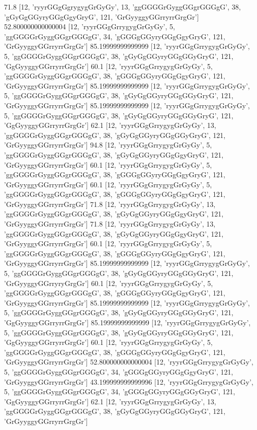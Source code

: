 71.8 [12, 'ryyrGGgGgrygygGrGyGy', 13, 'ggGGGGrGyggGGgrGGGgG', 38, 'gGyGgGGyryGGgGgyGryG', 121, 'GrGyyggyGGrryrrGrgGr']
52.800000000000004 [12, 'ryyrGGgGrrygygGrGyGy', 5, 'ggGGGGrGyggGGgrGGGgG', 34, 'gGGGgGGyryGGgGgyGryG', 121, 'GrGyyggyGGrryrrGrgGr']
85.19999999999999 [12, 'ryyrGGgGrrygygGrGyGy', 5, 'ggGGGGrGyggGGgrGGGgG', 38, 'gGyGgGGyryGGgGGyGryG', 121, 'GgGyyggyGGrryrrGrgGr']
60.1 [12, 'ryyrGGgGrrygygGrGyGy', 5, 'ggGGGGrGyggGGgrGGGgG', 38, 'gGGGgGGyryGGgGgyGryG', 121, 'GrGyyggyGGrryrrGrgGr']
85.19999999999999 [12, 'ryyrGGgGrrygygGrGyGy', 5, 'ggGGGGrGyggGGgrGGGgG', 38, 'gGyGgGGyryGGgGGyGryG', 121, 'GrGyyggyGGrryrrGrgGr']
85.19999999999999 [12, 'ryyrGGgGrrygygGrGyGy', 5, 'ggGGGGrGyggGGgrGGGgG', 38, 'gGyGgGGyryGGgGGyGryG', 121, 'GgGyyggyGGrryrrGrgGr']
62.1 [12, 'ryyrGGgGrrygygGrGyGy', 13, 'ggGGGGrGyggGGgrGGGgG', 38, 'gGyGgGGyryGGgGGyGryG', 121, 'GrGyyggyGGrryrrGrgGr']
94.8 [12, 'ryyrGGgGrrygygGrGyGy', 5, 'ggGGGGrGyggGGgrGGGgG', 38, 'gGyGgGGyryGGgGgyGryG', 121, 'GrGyyggyGGrryrrGrgGr']
60.1 [12, 'ryyrGGgGrrygygGrGyGy', 5, 'ggGGGGrGyggGGgrGGGgG', 38, 'gGGGgGGyryGGgGgyGryG', 121, 'GrGyyggyGGrryrrGrgGr']
60.1 [12, 'ryyrGGgGrrygygGrGyGy', 5, 'ggGGGGrGyggGGgrGGGgG', 38, 'gGGGgGGyryGGgGgyGryG', 121, 'GrGyyggyGGrryrrGrgGr']
71.8 [12, 'ryyrGGgGrrygygGrGyGy', 13, 'ggGGGGrGyggGGgrGGGgG', 38, 'gGyGgGGyryGGgGgyGryG', 121, 'GrGyyggyGGrryrrGrgGr']
71.8 [12, 'ryyrGGgGrrygygGrGyGy', 13, 'ggGGGGrGyggGGgrGGGgG', 38, 'gGyGgGGyryGGgGgyGryG', 121, 'GrGyyggyGGrryrrGrgGr']
60.1 [12, 'ryyrGGgGrrygygGrGyGy', 5, 'ggGGGGrGyggGGgrGGGgG', 38, 'gGGGgGGyryGGgGgyGryG', 121, 'GrGyyggyGGrryrrGrgGr']
85.19999999999999 [12, 'ryyrGGgGrrygygGrGyGy', 5, 'ggGGGGrGyggGGgrGGGgG', 38, 'gGyGgGGyryGGgGGyGryG', 121, 'GrGyyggyGGrryryGrgGr']
60.1 [12, 'ryyrGGgGrrygygGrGyGy', 5, 'ggGGGGrGyggGGgrGGGgG', 38, 'gGGGgGGyryGGgGgyGryG', 121, 'GrGyyggyGGrryrrGrgGr']
85.19999999999999 [12, 'ryyrGGgGrrygygGrGyGy', 5, 'ggGGGGrGyggGGgrGGGgG', 38, 'gGyGgGGyryGGgGGyGryG', 121, 'GgGyyggyGGrryrrGrgGr']
85.19999999999999 [12, 'ryyrGGgGrrygygGrGyGy', 5, 'ggGGGGrGyggGGgrGGGgG', 38, 'gGyGgGGyryGGgGGyGryG', 121, 'GgGyyggyGGrryrrGrgGr']
60.1 [12, 'ryyrGGgGrrygygGrGyGy', 5, 'ggGGGGrGyggGGgrGGGgG', 38, 'gGGGgGGyryGGgGgyGryG', 121, 'GrGyyggyGGrryrrGrgGr']
52.800000000000004 [12, 'ryyrGGgGrrygygGrGyGy', 5, 'ggGGGGrGyggGGgrGGGgG', 34, 'gGGGgGGyryGGgGgyGryG', 121, 'GrGyyggyGGrryrrGrgGr']
43.199999999999996 [12, 'ryyrGGgGrrygygGrGyGy', 5, 'ggGGGGrGyggGGgrGGGgG', 34, 'gGGGgGGyryGGgGGyGryG', 121, 'GgGyyggyGGrryrrGrgGr']
62.1 [12, 'ryyrGGgGrrygygGrGyGy', 13, 'ggGGGGrGyggGGgrGGGgG', 38, 'gGyGgGGyryGGgGGyGryG', 121, 'GrGyyggyGGrryrrGrgGr']
